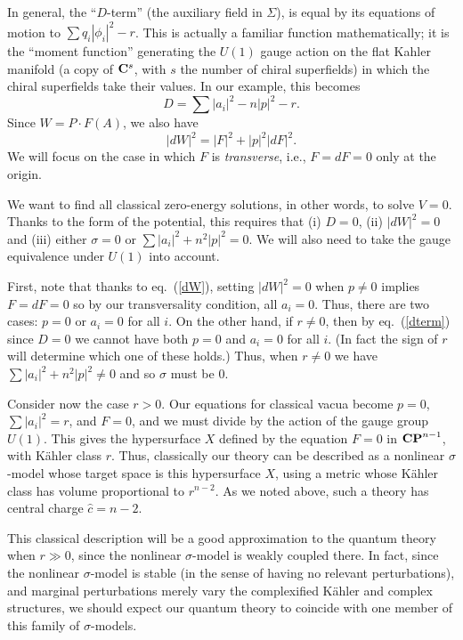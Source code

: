 In general, the ``$D$-term'' (the auxiliary field in $\Sigma$), is
equal by its equations of motion to $\sum q_i|\phi_i|^2-r$.
This is actually a familiar function mathematically; it is the ``moment
function'' generating the $U(1)$ gauge action on the flat Kahler manifold
(a copy of ${\bf C}^s$, with $s$ the number of chiral superfields)
in which the chiral superfields take their values.
 In our example, this becomes
\begin{equation}\label{dterm}
D=\sum|a_i|^2-n|p|^2-r.
\end{equation}
Since $W=P\cdot F(A)$, we also have
\begin{equation}\label{dW}
|dW|^2=|F|^2+|p|^2|dF|^2.
\end{equation}
We will focus on the case in which $F$ is {\it transverse}, i.e., $F=dF=0$
only at the origin.

We want to find all classical zero-energy solutions, in other words, to
solve $V=0$.  Thanks to the form of the potential, this requires that
(i) $D=0$, (ii) $|dW|^2=0$ and (iii) either $\sigma=0$ or
$\sum|a_i|^2+n^2|p|^2=0$.
We will also need to take the gauge equivalence under $U(1)$
into account.

First, note that thanks to eq.~(\ref{dW}), setting $|dW|^2=0$ when $p\ne0$
implies
$F=dF=0$ so by our transversality condition, all $a_i=0$.  Thus, there are
two cases: $p=0$ or $a_i=0$ for all $i$.  On the other hand, if $r\ne0$,
then by eq.~(\ref{dterm}) since $D=0$ we cannot have both $p=0$ and $a_i=0$ for
all $i$.  (In fact the sign of $r$ will determine which one of these
holds.)  Thus, when $r\ne0$ we have $\sum|a_i|^2+n^2|p|^2\ne0$ and so
$\sigma$ must be $0$.

Consider now the case $r>0$.  Our equations for classical vacua become
$p=0$, $\sum|a_i|^2=r$, and $F=0$, and we must divide by the action of the
gauge group $U(1)$.  This gives the hypersurface $X$ defined by the equation
$F=0$ in ${\bf
CP}^{n-1}$, with K\"ahler class $r$. Thus, classically our theory can
be described as a nonlinear $\sigma$-model whose target space is
this hypersurface $X$, using a metric whose K\"ahler class has volume
proportional to $r^{n-2}$.  As we noted above, such a theory
has central
charge $\widehat{c}=n-2$.

This classical description will be a good approximation to the quantum
theory when $r\gg0$, since the nonlinear
$\sigma$-model is weakly coupled there.
In fact, since the nonlinear $\sigma$-model is stable (in the sense of
having no
relevant perturbations), and marginal perturbations merely vary the
complexified
K\"ahler and complex structures,  we should expect our quantum theory to
coincide with one member of this family of $\sigma$-models.

